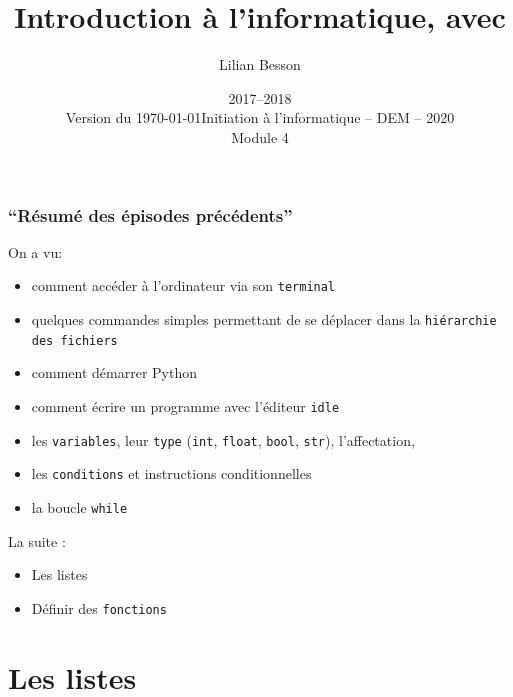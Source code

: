 \documentclass{beamer}
\title{Introduction à l'informatique, avec \pyth{}}
\author{Lilian Besson}
\date{2017--2018\\Version du \today}
\institute%
{
  ENS Rennes
  }
\date%
[Info -- DEM -- 2019]{Initiation à l'informatique -- DEM -- 2020\\Module 4}
\newcommand{\pyth}{{\sc Python}}
\newcommand{\prog}[1]{\alert{\texttt{#1}}}
\begin{document}
\frame{\titlepage}

\section[Outline]{}
\frame{\tableofcontents}
\frame
{
\frametitle{``Résumé des épisodes précédents''}
{
On a vu:
  \begin{itemize}
  \item comment accéder à l'ordinateur via son \prog{terminal}
  \item quelques commandes simples permettant de se déplacer dans la \prog{hiérarchie des fichiers}
  \item comment démarrer \pyth{}
  \item comment écrire un programme avec l'éditeur \prog{idle}
  \item les \prog{variables}, leur \prog{type} (\prog{int}, \prog{float}, \prog{bool}, \prog{str}), l'affectation,
  \item les \prog{conditions} et instructions conditionnelles
  \item la boucle \prog{while}
  \end{itemize}
  La suite :
  \begin{itemize}
    \item Les listes
    \item Définir des \prog{fonctions}
  \end{itemize}
}
}
\section{Les listes}
\end{document}
